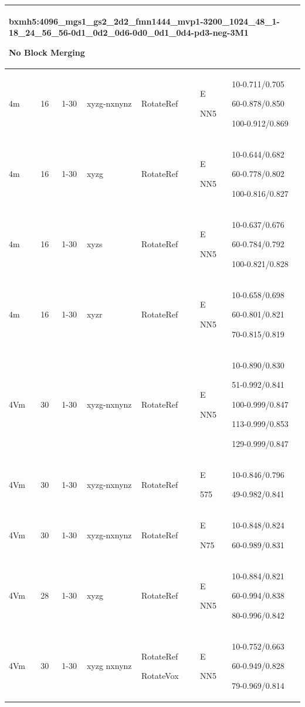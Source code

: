 \documentclass{article}
\begin{document}
\begin{tabular}{|p{1.5cm}|p{1.5cm}|p{1cm}|p{1.5cm}|p{1.5cm}|p{1.5cm}|p{5cm}| }
	\hline \hline
	\multicolumn{7}{|p{14cm}|}{bxmh5:4096\_mgs1\_gs2\_2d2\_fmn1444\_mvp1-3200\_1024\_48\_1-18\_24\_56\_56-0d1\_0d2\_0d6-0d0\_0d1\_0d4-pd3-neg-3M1\par No Block Merging 
	}\\
	\hline
	4m & 16 & 1-30 & xyzg-nxnynz & RotateRef & E\par NN5 & 10-0.711/0.705\par 60-0.878/0.850\par 100-0.912/0.869\\
	\hline 
	4m & 16 & 1-30 & xyzg & RotateRef & E\par NN5 & 10-0.644/0.682\par 60-0.778/0.802\par 100-0.816/0.827\\
	\hline 
	4m & 16 & 1-30 & xyzs & RotateRef & E\par NN5 & 10-0.637/0.676\par 60-0.784/0.792\par 100-0.821/0.828\\
	\hline 
	4m & 16 & 1-30 & xyzr & RotateRef & E\par NN5 & 10-0.658/0.698\par 60-0.801/0.821\par 70-0.815/0.819\\
	\hline 
	4Vm & 30 & 1-30 & xyzg-nxnynz & RotateRef & E\par NN5 & 10-0.890/0.830\par 51-0.992/0.841\par 100-0.999/0.847\par 113-0.999/0.853\par 129-0.999/0.847\\
	\hline 
	4Vm & 30 & 1-30 & xyzg-nxnynz & RotateRef & E\par 575 & 10-0.846/0.796\par 49-0.982/0.841\\
	\hline 
	4Vm & 30 & 1-30 & xyzg-nxnynz & RotateRef & E\par N75 & 10-0.848/0.824\par 60-0.989/0.831\\
	\hline
	4Vm & 28 & 1-30 & xyzg & RotateRef & E\par NN5 & 10-0.884/0.821\par 60-0.994/0.838\par 80-0.996/0.842\\
	\hline 
	4Vm & 30 & 1-30 & xyzg nxnynz & RotateRef\par RotateVox & E\par NN5 & 10-0.752/0.663\par 60-0.949/0.828\par 79-0.969/0.814\\
	\hline \hline
	

\end{tabular}
\end{document}
